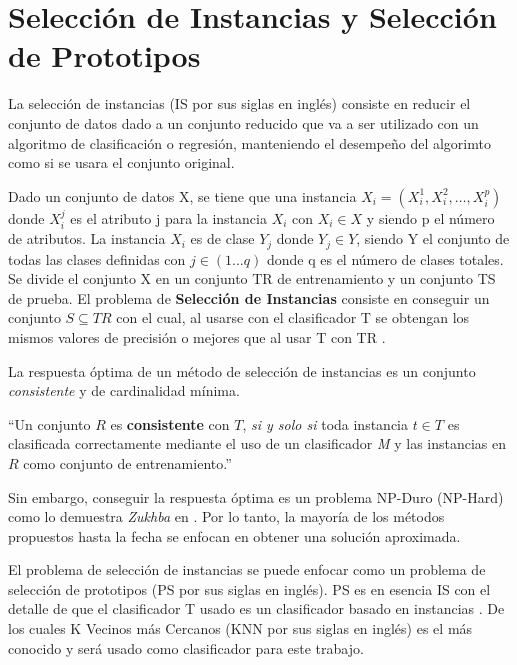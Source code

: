 \section{Selección de Instancias y Selección de Prototipos}

La selección de instancias (IS por sus siglas en inglés) consiste en reducir el conjunto de datos dado a un conjunto reducido que va a ser utilizado con un algoritmo de clasificación o regresión, manteniendo el desempeño del algorimto como si se usara el conjunto original.\\

\begin{definicion}
Dado un conjunto de datos X, se tiene que una instancia $X_i = (X_i^1,X_i^2,\dots,X_i^p)$ donde $X_i^j$ es el atributo j para la instancia $X_i$ con $X_i\in X$ y siendo p el número de atributos. La instancia $X_i$ es de clase $Y_j$ donde $Y_j\in Y$, siendo Y el conjunto de todas las clases definidas con $j\in (1\dots q)$ donde q es el número de clases totales. Se divide el conjunto X en un conjunto TR de entrenamiento y un conjunto TS de prueba. El problema de \textbf{Selección de Instancias} consiste en conseguir un conjunto $S\subseteq TR$ con el cual, al usarse con el clasificador T se obtengan los mismos valores de precisión o mejores que al usar T con TR \cite{garcia2016data}.
\end{definicion}

La respuesta óptima de un método de selección de instancias es un conjunto \emph{consistente} y de cardinalidad mínima.\\

\begin{definicion}
``Un conjunto $R$ es \textbf{consistente} con $T$, \emph{si y solo si} toda instancia $t \in T$ es clasificada correctamente mediante el uso de un clasificador \emph{M} y las instancias en $R$ como conjunto de entrenamiento.'' \cite{flores2014metaheuristics}
\end{definicion}

Sin embargo, conseguir la respuesta óptima es un problema NP-Duro (NP-Hard) como lo demuestra \emph{Zukhba} en \cite{zukhba2010np}. Por lo tanto, la mayoría de los métodos propuestos hasta la fecha se enfocan en obtener una solución aproximada.

El problema de selección de instancias se puede enfocar como un problema de selección de prototipos (PS por sus siglas en inglés). PS es en esencia IS con el detalle de que el clasificador T usado es un clasificador basado en instancias \cite{garcia2016data}. De los cuales K Vecinos más Cercanos (KNN por sus siglas en inglés) es el más conocido y será usado como clasificador para este trabajo.

